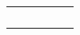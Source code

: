 \documentclass[12pt,a4paper]{article}
\begin{document}
\begin{landscape}
\begin{table}[ht!]
\begin{tabular}{|c|l|l|l|c|c|}
			                                                       &                           & \multirow{1}{*}{\gbbbbbbbbbbbbbb}   &              &                                                                                     &                                                                  \\\cline{3-4}
			                                                       &                           & \multirow{2}{*}{\gbbbbbbbbbbbbbbb}  &              &                                                                                     &                                                                  \\\cline{4-4}
			                                                       &                           &                                     &              &                                                                                     &                                                                  \\\cline{3-4}
			                                                       &                           & \multirow{2}{*}{\gbbbbbbbbbbbbbbbb} &              &                                                                                     &                                                                  \\\cline{4-4}
			                                                       &                           &                                     &              &                                                                                     &                                                                  \\\hline
		\end{tabular}
	\end{table}
\end{landscape}
\end{document}
